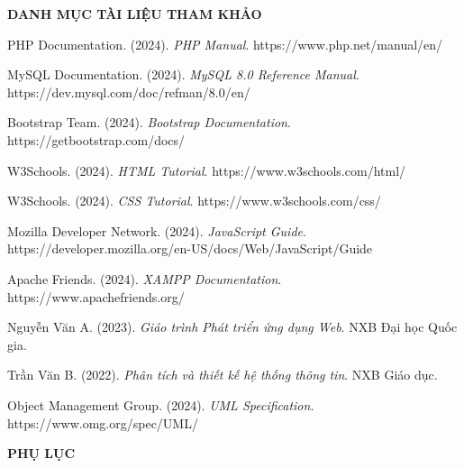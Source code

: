 \documentclass[a4paper,13pt]{extreport}
\begin{document}
\newpage
{}
\begin{center}
\textbf{\Large DANH MỤC TÀI LIỆU THAM KHẢO}
\end{center}
\vspace{1cm}

\begin{enumerate}[label={[\arabic*]}]
    \item PHP Documentation. (2024). \textit{PHP Manual}. https://www.php.net/manual/en/
    
    \item MySQL Documentation. (2024). \textit{MySQL 8.0 Reference Manual}. https://dev.mysql.com/doc/refman/8.0/en/
    
    \item Bootstrap Team. (2024). \textit{Bootstrap Documentation}. https://getbootstrap.com/docs/
    
    \item W3Schools. (2024). \textit{HTML Tutorial}. https://www.w3schools.com/html/
    
    \item W3Schools. (2024). \textit{CSS Tutorial}. https://www.w3schools.com/css/
    
    \item Mozilla Developer Network. (2024). \textit{JavaScript Guide}. https://developer.mozilla.org/en-US/docs/Web/JavaScript/Guide
    
    \item Apache Friends. (2024). \textit{XAMPP Documentation}. https://www.apachefriends.org/
    
    \item Nguyễn Văn A. (2023). \textit{Giáo trình Phát triển ứng dụng Web}. NXB Đại học Quốc gia.
    
    \item Trần Văn B. (2022). \textit{Phân tích và thiết kế hệ thống thông tin}. NXB Giáo dục.
    
    \item Object Management Group. (2024). \textit{UML Specification}. https://www.omg.org/spec/UML/
\end{enumerate}

\newpage
{}
\begin{center}
\textbf{\Large PHỤ LỤC}
\end{center}
\vspace{1cm}
\end{document}
